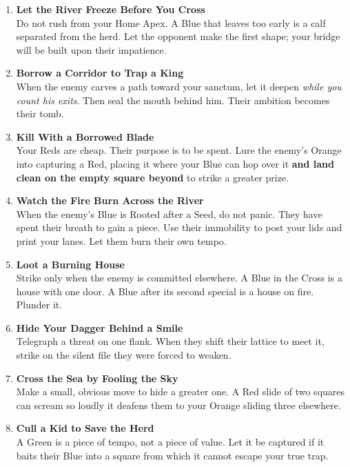 \documentclass[11pt]{article}
\begin{document}
\begin{enumerate}[leftmargin=*,label=\textbf{\arabic*.}]
\item \textbf{Let the River Freeze Before You Cross}\\
Do not rush from your Home Apex. A Blue that leaves too early is a calf separated from the herd. Let the opponent make the first shape; your bridge will be built upon their impatience.

\item \textbf{Borrow a Corridor to Trap a King}\\
When the enemy carves a path toward your sanctum, let it deepen \emph{while you count his exits}. Then seal the mouth behind him. Their ambition becomes their tomb.

\item \textbf{Kill With a Borrowed Blade}\\
Your Reds are cheap. Their purpose is to be spent. Lure the enemy's Orange into capturing a Red, placing it where your Blue can hop over it \textbf{and land clean on the empty square beyond} to strike a greater prize.

\item \textbf{Watch the Fire Burn Across the River}\\
When the enemy's Blue is Rooted after a Seed, do not panic. They have spent their breath to gain a piece. Use their immobility to post your lids and print your lanes. Let them burn their own tempo.

\item \textbf{Loot a Burning House}\\
Strike only when the enemy is committed elsewhere. A Blue in the Cross is a house with one door. A Blue after its second special is a house on fire. Plunder it.

\item \textbf{Hide Your Dagger Behind a Smile}\\
Telegraph a threat on one flank. When they shift their lattice to meet it, strike on the silent file they were forced to weaken.

\item \textbf{Cross the Sea by Fooling the Sky}\\
Make a small, obvious move to hide a greater one. A Red slide of two squares can scream so loudly it deafens them to your Orange sliding three elsewhere.

\item \textbf{Cull a Kid to Save the Herd}\\
A Green is a piece of tempo, not a piece of value. Let it be captured if it baits their Blue into a square from which it cannot escape your true trap.


\end{enumerate}
\end{document}
